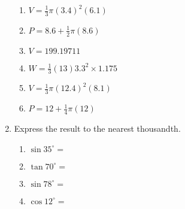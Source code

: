 \begin{enumerate}
\begin{multicols}{2}
\begin{enumerate}
    \item $V=\frac{1}{3} \pi (3.4)^2(6.1)$
    \item $P=8.6 + \frac{1}{2} \pi (8.6)$  
    \item $V=199.19711$
    \item $W=\frac{1}{3} (13)  3.3^2 \times 1.175$
    \item $V=\frac{1}{3} \pi (12.4)^2(8.1)$
    \item $P=12 + \frac{1}{4} \pi (12)$ 
  \end{enumerate}
  \end{multicols}%

\newpage
\item Express the result to the nearest thousandth.  \vspace{1cm}
  \begin{multicols}{2}
    \begin{enumerate}
      \item $\sin 35^\circ = $ \vspace{1cm}
      \item $\tan 70^\circ =$
      \item $\sin 78^\circ = $ \vspace{1cm}
      \item $\cos 12^\circ =$
    \end{enumerate}
  \end{multicols} \vspace{0.5cm}


\end{enumerate}
